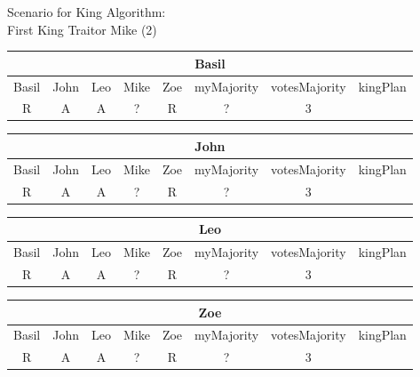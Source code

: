 \begin{wideslide}[bm=,toc=]{\large Scenario for King Algorithm:\\First King Traitor Mike (2)}
\vspace*{2ex}
\begin{center}
\begin{paenv}

\begin{tabular}{|c|c|c|c|c||c|c|c|}
\hline
\multicolumn{8}{|c|}{Basil}\\\hline
Basil & John & Leo & Mike & Zoe & myMajority & votesMajority & kingPlan \\\hline
R&A&A&?&R&?&3&\\\hline
\end{tabular}
\smallskip

\begin{tabular}{|c|c|c|c|c||c|c|c|}
\hline
\multicolumn{8}{|c|}{John}\\\hline
Basil & John & Leo & Mike & Zoe & myMajority & votesMajority & kingPlan \\\hline
R&A&A&?&R&?&3&\\\hline
\end{tabular}
\smallskip

\begin{tabular}{|c|c|c|c|c||c|c|c|}
\hline
\multicolumn{8}{|c|}{Leo}\\\hline
Basil & John & Leo & Mike & Zoe & myMajority & votesMajority & kingPlan \\\hline
R&A&A&?&R&?&3&\\\hline
\end{tabular}
\smallskip

\begin{tabular}{|c|c|c|c|c||c|c|c|}
\hline
\multicolumn{8}{|c|}{Zoe}\\\hline
Basil & John & Leo & Mike & Zoe & myMajority & votesMajority & kingPlan \\\hline
R&A&A&?&R&?&3&\\\hline
\end{tabular}
\end{paenv}
\end{center}
\end{wideslide}

